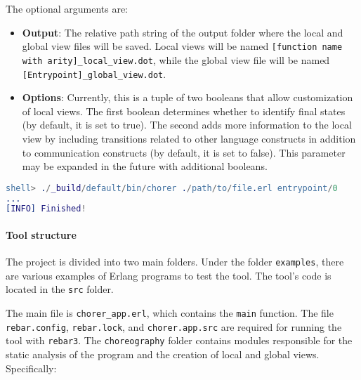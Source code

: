 \noindent The optional arguments are:
\begin{itemize}
    \item \textbf{Output}: The relative path string of the output folder where
    the local and global view files will be saved. Local views will be named
    \texttt{[function name with arity]\_local\_view.dot}, while the global view
    file will be named \texttt{[Entrypoint]\_global\_view.dot}.
    \item \textbf{Options}: Currently, this is a tuple of two booleans that
    allow customization of local views. The first boolean determines whether to
    identify final states (by default, it is set to true). The second adds more
    information to the local view by including transitions related to other
    language constructs in addition to communication constructs (by default, it
    is set to false). This parameter may be expanded in the future with
    additional booleans.
\end{itemize}

\begin{lstlisting}[language=Erlang, caption=Use example of the tool]
shell> ./_build/default/bin/chorer ./path/to/file.erl entrypoint/0
...
[INFO] Finished!
\end{lstlisting}

\paragraph{Tool structure}
The project is divided into two main folders. Under the folder \texttt{examples},
there are various examples of Erlang programs to test the tool. The tool's code
is located in the \texttt{src} folder.

\bigskip


\bigskip

The main file is \texttt{chorer\_app.erl}, which contains the \texttt{main}
function. The file \texttt{rebar.config}, \texttt{rebar.lock}, and
\texttt{chorer.app.src} are required for running the tool with \texttt{rebar3}.
The \texttt{choreography} folder contains modules responsible for the static
analysis of the program and the creation of local and global views. Specifically:

